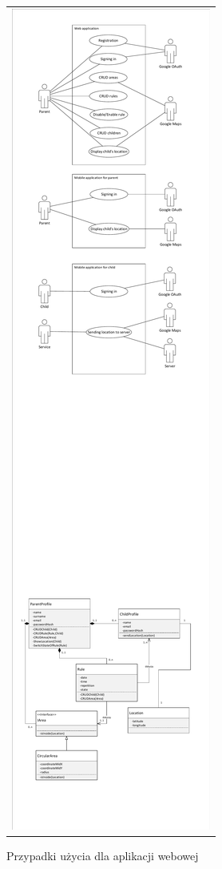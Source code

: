 \documentclass{sprawozdanie-agh}
\begin{document}
		\begin{figure}[H]
			\centering
			\begin{tabular}{c}
				\includegraphics[width=.80\textwidth]{webUseCase} 
			\end{tabular} 
		\caption{Przypadki użycia dla aplikacji webowej}
		\end{figure}
\end{document}
